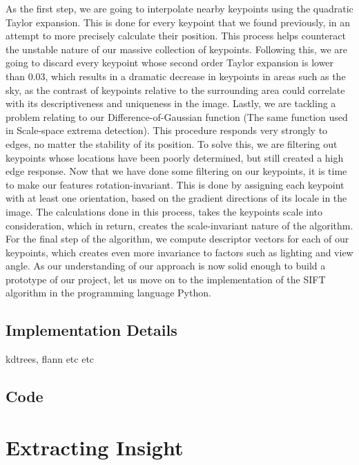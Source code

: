 \documentclass{article}
\begin{document}
As the first step, we are going to interpolate nearby keypoints using the quadratic Taylor expansion. This is done for every keypoint that we found previously, in an attempt to more precisely calculate their position. This process helps counteract the unstable nature of our massive collection of keypoints.  
\newline\newline
Following this, we are going to discard every keypoint whose second order Taylor expansion is lower than 0.03, which results in a dramatic decrease in keypoints in areas such as the sky, as the contrast of keypoints relative to the surrounding area could correlate with its descriptiveness and uniqueness in the image.  Lastly, we are tackling a problem relating to our Difference-of-Gaussian function (The same function used in Scale-space extrema detection). This procedure responds very strongly to edges, no matter the stability of its position. To solve this, we are filtering out keypoints whose locations have been poorly determined, but still created a high edge response.    
\newline\newline
Now that we have done some filtering on our keypoints, it is time to make our features rotation-invariant. This is done by assigning each keypoint with at least one orientation, based on the gradient directions of its locale in the image. The calculations done in this process, takes the keypoints scale into consideration, which in return, creates the scale-invariant nature of the algorithm.  For the final step of the algorithm, we compute descriptor vectors for each of our keypoints, which creates even more invariance to factors such as lighting and view angle.
\newline\newline
As our understanding of our approach is now solid enough to build a prototype of our project, let us move on to the implementation of the SIFT algorithm in the programming language Python.
\subsection{Implementation Details}
kdtrees, flann etc etc
\subsection{Code}



\section{Extracting Insight}
\end{document}
